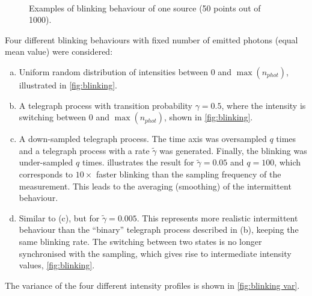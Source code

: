 \begin{figure}[!tb]
	\centering
	\newcommand{\sizef}{.35}
	\\
	\subfloat[telegraph ($\tilde{\gamma}=0.05$) down-sampled]{
	\texttt{[image: \\qd S455/images/blinkmatS565]}} %
	\caption{Examples of blinking behaviour of one source (50 points out of 1000).}
	\label{fig:blinking}
\end{figure}\noindent
%
Four different blinking behaviours with fixed number of emitted photons (equal mean value) were considered: 
%
\begin{enumerate}[(a)]
	\item
	Uniform random distribution of intensities between $0$ and $\max(n_{phot})$, illustrated in  \autoref{fig:blinking}\aaa. 
	\item
	A telegraph process with transition probability $\gamma=0.5$, where the intensity is switching between $0$ and $\max(n_{phot})$, shown in \autoref{fig:blinking}\bbb.
	\item
	A down-sampled telegraph process. The time axis was oversampled $q$ times and a telegraph process with a rate $\tilde{\gamma}$ was generated. Finally, the blinking was under-sampled $q$ times. \ccc{} illustrates the result for $\tilde{\gamma}=0.05$ and $q=100$, which corresponds to $10\times$ faster blinking than the sampling frequency of the measurement. This leads to the averaging (smoothing) of the intermittent behaviour.
	\item
	Similar to (c), but for $\tilde{\gamma}=0.005$. This represents more realistic intermittent behaviour than the ``binary'' telegraph process described in (b), keeping the same blinking rate. The switching between two states is no longer synchronised with the sampling, which gives rise to intermediate intensity values, \autoref{fig:blinking}\ddd. 
\end{enumerate}
%
The variance of the four different intensity profiles is shown in \autoref{fig:blinking var}.
	
